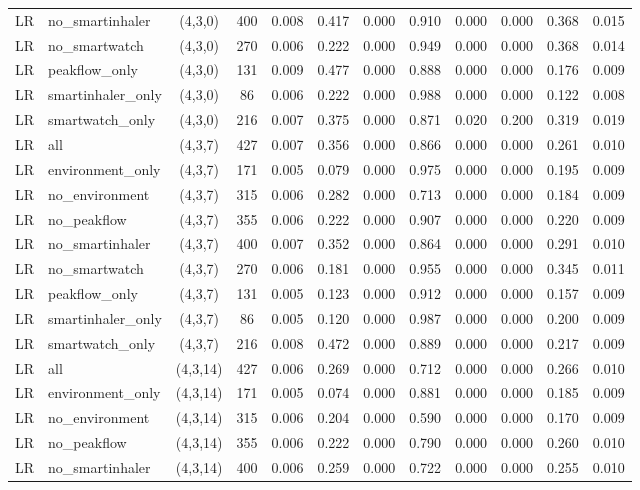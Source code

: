 \begin{longtable}{llcccccccccc}
LR & no\_smartinhaler & (4,3,0) & 400 & 0.008 & 0.417 & 0.000 & 0.910 & 0.000 & 0.000 & 0.368 & 0.015 \\
LR & no\_smartwatch & (4,3,0) & 270 & 0.006 & 0.222 & 0.000 & 0.949 & 0.000 & 0.000 & 0.368 & 0.014 \\
LR & peakflow\_only & (4,3,0) & 131 & 0.009 & 0.477 & 0.000 & 0.888 & 0.000 & 0.000 & 0.176 & 0.009 \\
LR & smartinhaler\_only & (4,3,0) & 86 & 0.006 & 0.222 & 0.000 & 0.988 & 0.000 & 0.000 & 0.122 & 0.008 \\
LR & smartwatch\_only & (4,3,0) & 216 & 0.007 & 0.375 & 0.000 & 0.871 & 0.020 & 0.200 & 0.319 & 0.019 \\
LR & all & (4,3,7) & 427 & 0.007 & 0.356 & 0.000 & 0.866 & 0.000 & 0.000 & 0.261 & 0.010 \\
LR & environment\_only & (4,3,7) & 171 & 0.005 & 0.079 & 0.000 & 0.975 & 0.000 & 0.000 & 0.195 & 0.009 \\
LR & no\_environment & (4,3,7) & 315 & 0.006 & 0.282 & 0.000 & 0.713 & 0.000 & 0.000 & 0.184 & 0.009 \\
LR & no\_peakflow & (4,3,7) & 355 & 0.006 & 0.222 & 0.000 & 0.907 & 0.000 & 0.000 & 0.220 & 0.009 \\
LR & no\_smartinhaler & (4,3,7) & 400 & 0.007 & 0.352 & 0.000 & 0.864 & 0.000 & 0.000 & 0.291 & 0.010 \\
LR & no\_smartwatch & (4,3,7) & 270 & 0.006 & 0.181 & 0.000 & 0.955 & 0.000 & 0.000 & 0.345 & 0.011 \\
LR & peakflow\_only & (4,3,7) & 131 & 0.005 & 0.123 & 0.000 & 0.912 & 0.000 & 0.000 & 0.157 & 0.009 \\
LR & smartinhaler\_only & (4,3,7) & 86 & 0.005 & 0.120 & 0.000 & 0.987 & 0.000 & 0.000 & 0.200 & 0.009 \\
LR & smartwatch\_only & (4,3,7) & 216 & 0.008 & 0.472 & 0.000 & 0.889 & 0.000 & 0.000 & 0.217 & 0.009 \\
LR & all & (4,3,14) & 427 & 0.006 & 0.269 & 0.000 & 0.712 & 0.000 & 0.000 & 0.266 & 0.010 \\
LR & environment\_only & (4,3,14) & 171 & 0.005 & 0.074 & 0.000 & 0.881 & 0.000 & 0.000 & 0.185 & 0.009 \\
LR & no\_environment & (4,3,14) & 315 & 0.006 & 0.204 & 0.000 & 0.590 & 0.000 & 0.000 & 0.170 & 0.009 \\
LR & no\_peakflow & (4,3,14) & 355 & 0.006 & 0.222 & 0.000 & 0.790 & 0.000 & 0.000 & 0.260 & 0.010 \\
LR & no\_smartinhaler & (4,3,14) & 400 & 0.006 & 0.259 & 0.000 & 0.722 & 0.000 & 0.000 & 0.255 & 0.010 \\

\end{longtable}
